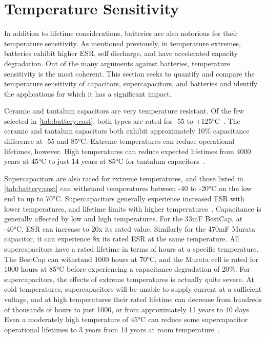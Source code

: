 \section{Temperature Sensitivity}
In addition to lifetime considerations, batteries are also notorious for their temperature sensitivity. As mentioned previously, in temperature extremes, batteries exhibit higher ESR, self discharge, and have accelerated capacity degradation. Out of the many arguments against batteries, temperature sensitivity is the most coherent. This section seeks to quantify and compare the temperature sensitivity of capacitors, supercapacitors, and batteries and identify the applications for which it has a significant impact.

Ceramic and tantalum capacitors are very temperature resistant. Of the few selected in \cref{tab:battery:cost}, both types are rated for -55 to +125\si{\celsius}~\cite{ceramicDatasheet,ceramicDatasheet2,tantalumDatasheet}. The ceramic and tantalum capacitors both exhibit approximately 10\% capacitance difference at -55 and 85\si{\celsius}. Extreme temperatures can reduce operational lifetimes, however. High temperatures can reduce expected lifetimes from 4000 years at 45\si{\celsius} to just 14 years at 85\si{\celsius} for tantalum capacitors~\cite{kemetLife}.

Supercapacitors are also rated for extreme temperatures, and those listed in \cref{tab:battery:cost} can withstand temperatures between -40 to -20\si{\celsius} on the low end to up to 70\si{\celsius}. Supercapacitors generally experience increased ESR with lower temperatures, and lifetime limits with higher temperatures~\cite{murataCap,bestCap,kreczanik2013study,murataTech}. Capacitance is generally affected by low and high temperatures. For the 33\si{\milli\farad} BestCap, at -40\si{\celsius}, ESR can increase to 20x its rated value. Similarly for the 470\si{\milli\farad} Murata capacitor, it can experience 8x its rated ESR at the same temperature. All supercapacitors have a rated lifetime in terms of hours at a specific temperature. The BestCap can withstand 1000 hours at 70\si{\celsius}, and the Murata cell is rated for 1000 hours at 85\si{\celsius} before experiencing a capacitance degradation of 20\%. For supercapacitors, the effects of extreme temperatures is actually quite severe. At cold temperatures, supercapacitors will be unable to supply current at a sufficient voltage, and at high temperatures their rated lifetime can decrease from hundreds of thousands of hours to just 1000, or from approximately 11 years to 40 days. Even a moderately high temperature of 45\si{\celsius} can reduce some supercapacitor operational lifetimes to 3 years from 14 years at room temperature~\cite{kreczanik2013study}.

